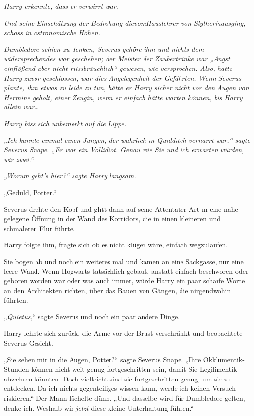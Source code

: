 {\emph{Harry erkannte, dass er verwirrt war.}

\emph{Und seine Einschätzung der Bedrohung dievom\emph{Hauslehrer von Slytherin}ausging,} \emph{schoss in astronomische Höhen.}

\emph{Dumbledore schien zu denken, Severus} \emph{gehöre} \emph{ihm und nichts dem widersprechendes war geschehen; der Meister der Zaubertränke war „Angst einflößend aber nicht missbräuchlich“ gewesen, wie versprochen.} \emph{Also, hatte Harry} \emph{zuvor} \emph{geschlossen, war dies Angelegenheit der} \emph{Gefährten. Wenn Severus plante, ihm etwas zu leide zu tun, hätte er Harry sicher nicht vor den Augen von Hermine geholt, einer Zeugin, wenn er einfach hätte warten können, bis Harry allein war…}

\emph{Harry biss sich} \emph{unbemerkt} \emph{auf die Lippe.}

\emph{„Ich kannte einmal einen} \emph{Jungen, der wahrlich in Quidditch vernarrt war,“ sagte Severus Snape. „Er war ein Vollidiot.} \emph{Genau wie Sie und ich erwarten würden, wir zwei.“}

\emph{„Worum} \emph{\emph{geht's}} \emph{hier?“ sagte Harry langsam.}

„Geduld, Potter.“

Severus drehte den Kopf und glitt dann auf seine Attentäter-Art in eine nahe gelegene Öffnung in der Wand des Korridors, die in einen kleineren und schmaleren Flur führte.

Harry folgte ihm, fragte sich ob es nicht klüger wäre, einfach wegzulaufen.

Sie bogen ab und noch ein weiteres mal und kamen an eine Sackgasse, nur eine leere Wand. Wenn Hogwarts tatsächlich gebaut, anstatt einfach beschworen oder geboren worden war oder was auch immer, würde Harry ein paar scharfe Worte an den Architekten richten, über das Bauen von Gängen, die nirgendwohin führten.

„\emph{Quietus,}“ sagte Severus und noch ein paar andere Dinge.

Harry lehnte sich zurück, die Arme vor der Brust verschränkt und beobachtete Severus Gesicht.

„Sie sehen mir in die Augen, Potter?“ sagte Severus Snape. „Ihre Okklumentik-Stunden können nicht weit genug fortgeschritten sein, damit Sie Legilimentik abwehren könnten. Doch vielleicht sind sie fortgeschritten genug, um sie zu entdecken. Da ich nichts gegenteiliges wissen kann, werde ich keinen Versuch riskieren.“ Der Mann lächelte dünn. „Und dasselbe wird für Dumbledore gelten, denke ich. Weshalb wir \emph{jetzt} diese kleine Unterhaltung führen.“

}
